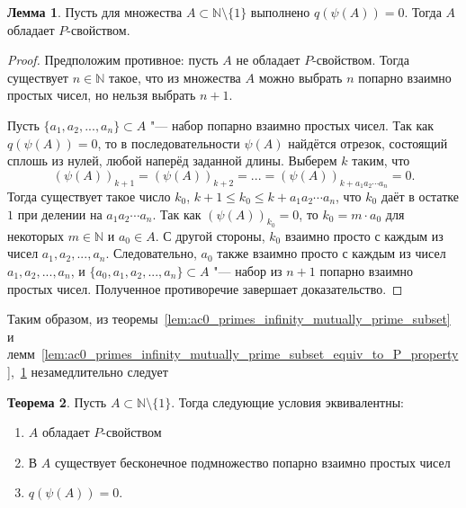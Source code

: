 \documentclass[a4paper,openbib]{article}
\renewcommand{\leq}{\leqslant}
\theoremstyle{definition}
\newtheorem{lemma}{Лемма}[section]
\newtheorem{theorem}[lemma]{Теорема}
\begin{document}

\begin{lemma}
	\label{lem:ac0_primes_q_psi_A_0_causes_P}
	Пусть для множества $A\subset\mathbb{N}\setminus\{1\}$ выполнено $q(\psi(A))=0$.
	Тогда $A$ обладает $P$-свойством.
\end{lemma}

\begin{proof}
	Предположим противное: пусть $A$ не обладает $P$-свойством.
	Тогда существует $n\in\mathbb{N}$ такое, что из множества $A$ можно выбрать $n$
	попарно взаимно простых чисел, но нельзя выбрать $n+1$.

	Пусть $\{a_1, a_2, ..., a_n\}\subset A$ "--- набор попарно взаимно простых чисел.
	Так как $q(\psi(A))=0$, то в последовательности $\psi(A)$ найдётся отрезок, состоящий сплошь из нулей,
	любой наперёд заданной длины.
	Выберем $k$ таким, что
	\begin{equation}
		(\psi(A))_{k+1} = (\psi(A))_{k+2} = ... = (\psi(A))_{k+a_1a_2\cdots a_n} = 0
		.
	\end{equation}
	Тогда существует такое число $k_0$, $k+1 \leq k_0 \leq k+a_1a_2\cdots a_n$,
	что $k_0$ даёт в остатке $1$ при делении на $a_1a_2\cdots a_n$.
	Так как $(\psi(A))_{k_0} = 0$, то $k_0 = m\cdot a_0$ для некоторых $m\in\mathbb{N}$ и $a_0\in A$.
	С другой стороны, $k_0$ взаимно просто с каждым из чисел $a_1, a_2, ..., a_n$.
	Следовательно, $a_0$ также взаимно просто с каждым из чисел $a_1, a_2, ..., a_n$,
	и $\{a_0, a_1, a_2, ..., a_n\}\subset A$ "--- набор из $n+1$ попарно взаимно простых чисел.
	Полученное противоречие завершает доказательство.
\end{proof}

Таким образом,
из теоремы~\ref{lem:ac0_primes_infinity_mutually_prime_subset}
и лемм~\ref{lem:ac0_primes_infinity_mutually_prime_subset_equiv_to_P_property},~\ref{lem:ac0_primes_q_psi_A_0_causes_P}
незамедлительно следует
\begin{theorem}
	Пусть $A\subset \mathbb{N}\setminus\{1\}$.
	Тогда следующие условия эквивалентны:
	\begin{enumerate}[label=(\roman*)]
		\item
			$A$ обладает $P$-свойством
		\item
			В $A$ существует бесконечное подмножество попарно взаимно простых чисел
		\item
			$q(\psi(A))=0$.
	\end{enumerate}
\end{theorem}
\end{document}
